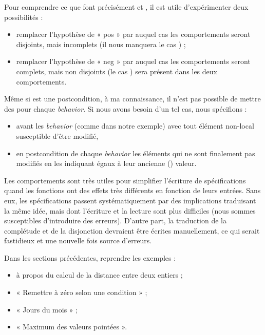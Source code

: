 Pour comprendre ce que font précisément  et , il est utile
d'expérimenter deux possibilités :
\begin{itemize}
\item remplacer l'hypothèse de « pos » par  auquel cas les
comportements seront disjoints, mais incomplets (il nous manquera le cas
) ;
\item remplacer l'hypothèse de « neg » par  auquel cas les
comportements seront complets, mais non disjoints (le cas ) sera
présent dans les deux comportements.
\end{itemize}


\begin{Warning}
Même si  est une postcondition, à ma connaissance, il n'est pas
possible de mettre des  pour chaque \textit{behavior}. Si nous avons
besoin d'un tel cas, nous spécifions :
\begin{itemize}
\item {} avant les \textit{behavior} (comme dans notre exemple) avec tout
élément non-local susceptible d'être modifié,
\item en postcondition de chaque \textit{behavior} les éléments qui ne sont finalement
pas modifiés en les indiquant égaux à leur ancienne () valeur.
\end{itemize}
\end{Warning}


Les comportements sont très utiles pour simplifier l'écriture de spécifications
quand les fonctions ont des effets très différents en fonction de leurs
entrées. Sans eux, les spécifications passent systématiquement par des
implications traduisant la même idée, mais dont l'écriture et la lecture sont
plus difficiles (nous sommes susceptibles d'introduire des erreurs).
D'autre part, la traduction de la complétude et de la disjonction devraient
être écrites manuellement, ce qui serait fastidieux et une nouvelle fois source
d'erreurs.







Dans les sections précédentes, reprendre les exemples :
\begin{itemize}
\item à propos du calcul de la distance entre deux entiers ;
\item « Remettre à zéro selon une condition » ;
\item « Jours du mois » ;
\item « Maximum des valeurs pointées ».
\end{itemize}


